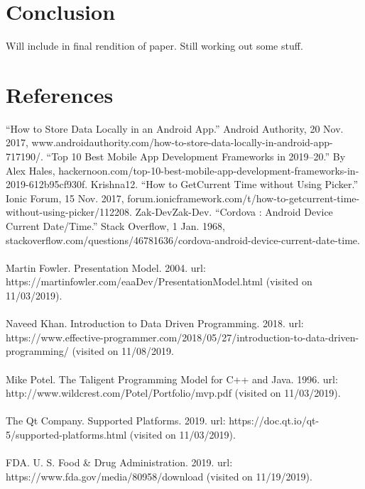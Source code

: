 \documentclass[onecolumn, draftclsnofoot,10pt, compsoc]{IEEEtran}
\begin{document}
\section{Conclusion}
Will include in final rendition of paper. Still working out some stuff.
\section{References}

“How to Store Data Locally in an Android App.” Android Authority, 20 Nov. 2017, www.androidauthority.com/how-to-store-data-locally-in-android-app-717190/.
\newline
\newline
“Top 10 Best Mobile App Development Frameworks in 2019–20.” By Alex Hales, hackernoon.com/top-10-best-mobile-app-development-frameworks-in-2019-612b95cf930f.
\newline
\newline
Krishna12. “How to GetCurrent Time without Using Picker.” Ionic Forum, 15 Nov. 2017, forum.ionicframework.com/t/how-to-getcurrent-time-without-using-picker/112208.
\newline
\newline
Zak-DevZak-Dev. “Cordova : Android Device Current Date/Time.” Stack Overflow, 1 Jan. 1968, stackoverflow.com/questions/46781636/cordova-android-device-current-date-time.
\\
\\
 Martin Fowler. Presentation Model. 2004. url: https://martinfowler.com/eaaDev/PresentationModel.html (visited on 11/03/2019).
 \\
 \\
 Naveed Khan. Introduction to Data Driven Programming. 2018. url: https://www.effective-programmer.com/2018/05/27/introduction-to-data-driven-programming/ (visited on 11/08/2019.
 \\
 \\
  Mike Potel. The Taligent Programming Model for C++ and Java. 1996. url: http://www.wildcrest.com/Potel/Portfolio/mvp.pdf (visited on 11/03/2019).
\\
\\
The Qt Company. Supported Platforms. 2019. url: https://doc.qt.io/qt-5/supported-platforms.html (visited on 11/03/2019).
\\
\\
FDA. U. S. Food \& Drug Administration. 2019. url: https://www.fda.gov/media/80958/download (visited on 11/19/2019).
\end{document}
